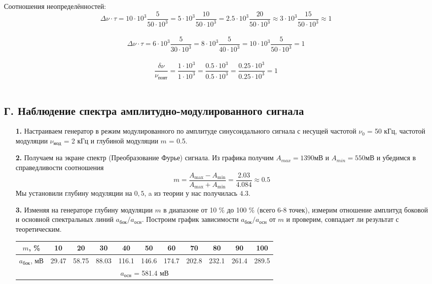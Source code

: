 \documentclass[a4paper,12pt]{article} %
\begin{document}
\begin{enumerate}
Соотношения неопределённостей:
$$ \Delta \nu \cdot \tau = 10\cdot10^3\frac{5}{50\cdot10^3} = 5\cdot10^3\frac{10}{50\cdot10^3} = 2.5\cdot10^3\frac{20}{50\cdot10^3} \approx 3\cdot10^3\frac{15}{50\cdot10^3} \approx 1 $$\\
$$ \Delta \nu \cdot \tau = 6\cdot10^3\frac{5}{30\cdot10^3} = 8\cdot10^3\frac{5}{40\cdot10^3} = 10\cdot10^3\frac{5}{50\cdot10^3} = 1 $$\\
$$ \frac{\delta \nu}{\nu_\text{повт}} = \frac{1\cdot10^3}{1\cdot10^3} = \frac{0.5\cdot10^3}{0.5\cdot10^3} = \frac{0.25\cdot10^3}{0.25\cdot10^3} = 1 $$\\







\newpage

\subsection*{Г. Наблюдение спектра амплитудно-модулированного сигнала}


\begin{enumerate}


\item [\textbf{1.}] Настраиваем генератор в режим модулированного по амплитуде синусоидального сигнала с несущей частотой $\nu_0$ = 50 кГц, частотой модуляции $\nu_\text{мод}$ = 2 кГц и глубиной модуляции $m$ = 0.5.

\item [\textbf{2.}] Получаем на экране спектр (Преобразование Фурье) сигнала. Из графика получим $A_{max} = 1390 \text{мВ}$ и $A_{min} = 550 \text{мВ}$ и убедимся в справедливости соотношения $$ m = \frac{A_\text{max} - A_\text{min}}{A_\text{max} + A_\text{min}} = \frac{2.03}{4.084} \approx 0.5 $$
Мы установили глубину модуляции на $0,5$, a из теории у нас получилась $4.3$.

\item [\textbf{3.}]
Изменяя на генераторе глубину модуляции $m$ в диапазоне от 10 \% до 100 \% (всего 6-8 точек), измерим отношение амплитуд боковой и основной 
спектральных линий $a_{\text{бок}}/a_{\text{осн}}$. Построим график зависимости $a_{\text{бок}}/a_{\text{осн}}$ от $m$ и проверим, совпадает ли 
результат с теоретическим.

\begin{center}
\begin{tabular}{|c|c|c|c|c|c|c|c|c|c|c|}
\hline
$m$, \% & 10 & 20 & 30 & 40 & 50 & 60 & 70 & 80& 90 & 100 \\ \hline
$a_{\text{бок}}$, мВ & 29.47 & 58.75 & 88.03 & 116.1 & 146.6 & 174.7 & 202.8 & 232.1& 261.4 & 289.5 \\ \hline
\multicolumn{11}{|c|}{$a_{\text{осн}}$ = 581.4 мВ} \\ \hline
\end{tabular}


\end{center}
\end{enumerate}
\end{enumerate}
\end{document}
